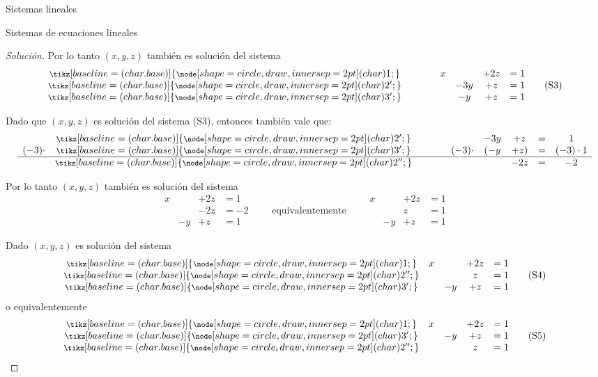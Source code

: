 \documentclass[a4paper,12pt,twoside,spanish]{amsbook}
\theoremstyle{definition}
\theoremstyle{remark}
\newcommand \circled[1]{\tikz[baseline=(char.base)]{
		\node[shape=circle,draw,inner sep=2pt] (char) {#1};}}
\begin{document}
\begin{chapter}{Sistemas lineales}
\begin{section}{Sistemas de ecuaciones lineales}
\begin{proof}[Solución]
Por lo tanto $(x,y,z)$ también es solución del sistema
\begin{equation*}
\begin{matrix}
{\footnotesize{\footnotesize\circled{1}}}&\qquad&x &  & +2z & = 1 \\
{\footnotesize{\footnotesize\circled{2'}}}&\qquad&& -3y & +z & = 1   \\
{\footnotesize{\footnotesize\circled{3'}}}&\qquad&& -y & +z & =1
\end{matrix}\tag{S3}
\end{equation*}
 

 
Dado que $(x,y,z)$ es solución del sistema (S3), entonces también vale que: 
\begin{equation*}
\begin{matrix}
&{\footnotesize{\footnotesize\circled{2'}}}&\qquad&& -3y & +z & = & 1 \\
(-3)\cdot&{\footnotesize{\footnotesize\circled{3'}}}&\qquad&(-3)\cdot&( -y & +z) & = &(-3)\cdot1 \\
\hline
&{\footnotesize{\footnotesize\circled{2''}}}&\qquad&&   & -2z & = & -2  
\end{matrix}
\end{equation*}

 
Por lo tanto $(x,y,z)$ también es solución del sistema
\begin{equation*}
\begin{matrix}
x &  & +2z & = 1 \\
&    & -2z & = -2\\
& -y & +z & =1 
\end{matrix}
\qquad\mbox{equivalentemente}\qquad
\begin{matrix}
x &  & +2z & = 1 \\
&    & z & = 1\\
& -y & +z & =1 
\end{matrix}
\end{equation*}
 

 
Dado $(x,y,z)$ es solución del sistema
\begin{equation*}
\begin{matrix}
{\footnotesize{\footnotesize\circled{1}}}&x &  & +2z & = 1 \\
{\footnotesize{\footnotesize\circled{2''}}}&&    & z & = 1 \\
{\footnotesize{\footnotesize\circled{3'}}}&& -y & +z & =1
\end{matrix}\tag{S4}
\end{equation*}
o equivalentemente 
\begin{equation*}
\begin{matrix}
{\footnotesize{\footnotesize\circled{1}}}&x &  & +2z & = 1 \\
{\footnotesize{\footnotesize\circled{3'}}}&& -y & +z & =1\\
{\footnotesize{\footnotesize\circled{2''}}}&&    & z & = 1 
\end{matrix}\tag{S5}
\end{equation*}


\end{proof}
\end{section}
\end{chapter}
\end{document}
